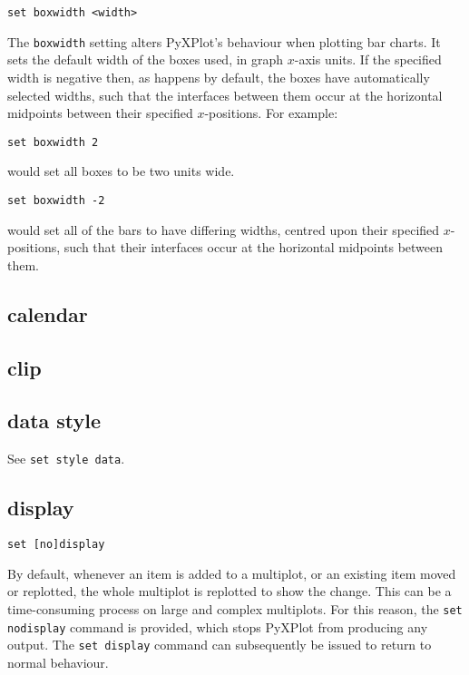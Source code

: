 \begin{verbatim}
set boxwidth <width>
\end{verbatim}

The {\tt boxwidth} setting alters PyXPlot's behaviour when plotting bar charts.
It sets the default width of the boxes used, in graph $x$-axis units.  If the
specified width is negative then, as happens by default, the boxes have
automatically selected widths, such that the interfaces between them occur at
the horizontal midpoints between their specified $x$-positions.  For example:

\begin{verbatim}
set boxwidth 2
\end{verbatim}

\noindent would set all boxes to be two units wide.

\begin{verbatim}
set boxwidth -2
\end{verbatim}

\noindent would set all of the bars to have differing widths, centred upon their
specified $x$-positions, such that their interfaces occur at the horizontal
midpoints between them.


\subsection{calendar}


\subsection{clip}


\subsection{data style}

See {\tt set style data}.


\subsection{display}

\begin{verbatim}
set [no]display
\end{verbatim}

By default, whenever an item is added to a multiplot, or an existing item moved
or replotted, the whole multiplot is replotted to show the change. This can be
a time-consuming process on large and complex multiplots. For this reason, the
{\tt set nodisplay} command is provided, which stops PyXPlot from producing any
output. The {\tt set display} command can subsequently be issued to return to
normal behaviour.


